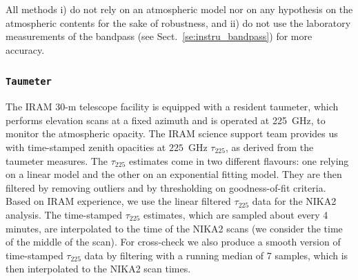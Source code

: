 All methods i) do not rely on an atmospheric model nor on any
hypothesis on the atmospheric contents for the sake of robustness, and
ii) do not use the laboratory measurements of the bandpass (see 
Sect.~\ref{se:instru_bandpass}) for more accuracy.  

\subsubsection{{\tt Taumeter}}
\label{se:taumeter-method}

The IRAM 30-m telescope facility is equipped with a resident taumeter,
which performs elevation scans at a fixed azimuth and is operated at
225~GHz, to monitor the atmospheric opacity. The IRAM science support
team provides us with time-stamped zenith opacities at $225$~GHz
$\tau_{225}$, as derived from the taumeter measures. The
$\tau_{225}$ estimates come in two different flavours: one relying
on a linear model and the other on an exponential fitting model. They
are then filtered by removing outliers and by thresholding on
goodness-of-fit criteria.
Based on IRAM experience, we use the linear filtered $\tau_{225}$
data for the NIKA2 analysis. The time-stamped $\tau_{225}$ estimates,
which are sampled about every 4 minutes, are interpolated to the time
of the NIKA2 scans (we consider the time of the middle of the
scan). For cross-check we also produce a smooth version of time-stamped
$\tau_{225}$ data by
filtering with a running median of 7 samples, which is then
interpolated to the NIKA2 scan times.


